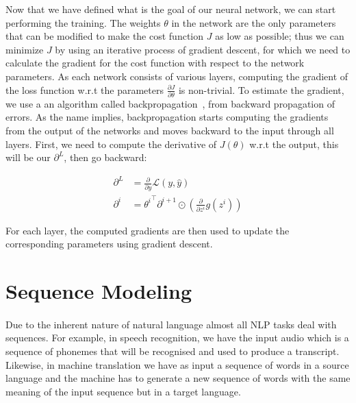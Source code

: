 Now that we have defined what is the goal of our neural network, we can start performing the training. %
The weights $\theta$ in the network are the only parameters that can be modified to make the cost function $J$ as low as possible; thus we can minimize $J$ by using an iterative process of gradient descent, for which we need to calculate the gradient for the cost function with respect to the network parameters.  As each network consists of various layers, computing the gradient of the loss function w.r.t the parameters $\frac{\partial J}{\partial \theta}$ is non-trivial. To estimate the gradient, we use a an algorithm called backpropagation~\citep{rumelhart1988learning}, from backward propagation of errors. As the name implies, backpropagation starts computing the gradients from the output of the networks and moves backward to the input through all layers. First, we need to compute the derivative of $J(\theta)$ w.r.t the output, this will be our $\partial^{L}$, then go backward:




\begin{equation}
\begin{split}
    \partial^{L} & = \frac{\partial}{\partial y} \mathcal{L}(y, \hat{y}) \\
    \partial^i &= {\theta^{i}}^\intercal \partial^{i+1} \odot \left(\frac{\partial}{\partial z^{i}} g(z^i)\right)
\end{split}
\label{eq:backpropagation}    
\end{equation}

For each layer, the computed gradients are then used to update the corresponding parameters using gradient descent.

\section{Sequence Modeling}
\label{sec:sequence_modeling}


\paragraph{}
Due to the inherent nature of natural language almost all NLP tasks deal with sequences. For example, in speech recognition, we have the input audio which is a sequence of phonemes that will be recognised and used to produce a transcript. Likewise, in machine translation we have as input a sequence of words in a source language and the machine has to generate a new sequence of words with the same meaning of the input sequence but in a target language.


